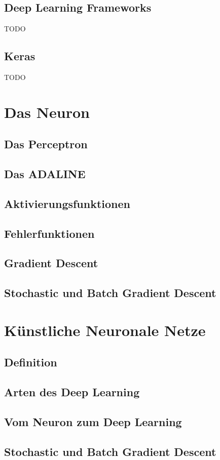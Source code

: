 \documentclass[conference, german]{IEEEtran}
\begin{document}
\subsection{Deep Learning Frameworks}
TODO
\subsection{Keras}
TODO
\section{Das Neuron}
\subsection{Das Perceptron}
\subsection{Das ADALINE}
\subsection{Aktivierungsfunktionen}
\subsection{Fehlerfunktionen}
\subsection{Gradient Descent}
\subsection{Stochastic und Batch Gradient Descent}
\section{Künstliche Neuronale Netze}
\subsection{Definition}
\subsection{Arten des Deep Learning}
\subsection{Vom Neuron zum Deep Learning}
\subsection{Stochastic und Batch Gradient Descent}
\end{document}

